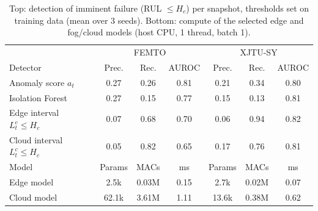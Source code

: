 \begin{table}[t]
\centering
\caption{Top: detection of imminent failure (RUL $\le H_c$) per snapshot, thresholds set on training data (mean over 3 seeds). Bottom: compute of the selected edge and fog/cloud models (host CPU, 1 thread, batch 1).}
\label{tab:detect}
\footnotesize\setlength{\tabcolsep}{2.4pt}
\begin{tabular}{l|ccc|ccc}
\toprule
 & \multicolumn{3}{c|}{FEMTO} & \multicolumn{3}{c}{XJTU-SY} \\
Detector & Prec. & Rec. & AUROC & Prec. & Rec. & AUROC \\
\midrule
Anomaly score $a_t$ & 0.27 & 0.26 & 0.81 & 0.21 & 0.34 & 0.80 \\
Isolation Forest & 0.27 & 0.15 & 0.77 & 0.15 & 0.13 & 0.81 \\
Edge interval $L^e_t\le H_c$ & 0.07 & 0.68 & 0.70 & 0.06 & 0.94 & 0.82 \\
Cloud interval $L^c_t\le H_c$ & 0.05 & 0.82 & 0.65 & 0.17 & 0.76 & 0.81 \\
\midrule
Model & Params & MACs & ms & Params & MACs & ms \\
\midrule
Edge model & 2.5k & 0.03M & 0.15 & 2.7k & 0.02M & 0.07 \\
Cloud model & 62.1k & 3.61M & 1.11 & 13.6k & 0.38M & 0.62 \\
\bottomrule
\end{tabular}
\end{table}
